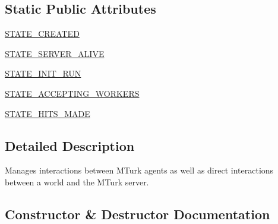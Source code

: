 \subsection*{Static Public Attributes}
\begin{DoxyCompactItemize}
\item 
\hyperlink{classparlai_1_1mturk_1_1core_1_1mturk__manager_1_1MTurkManager_a68e114fed1b4dd106918d9c0de86075b}{S\+T\+A\+T\+E\+\_\+\+C\+R\+E\+A\+T\+ED}
\item 
\hyperlink{classparlai_1_1mturk_1_1core_1_1mturk__manager_1_1MTurkManager_a614fcb4f1df8b5c9c453dcd55e2dd29c}{S\+T\+A\+T\+E\+\_\+\+S\+E\+R\+V\+E\+R\+\_\+\+A\+L\+I\+VE}
\item 
\hyperlink{classparlai_1_1mturk_1_1core_1_1mturk__manager_1_1MTurkManager_a5ea29af39d36c6ab07fb33b3d41885a9}{S\+T\+A\+T\+E\+\_\+\+I\+N\+I\+T\+\_\+\+R\+UN}
\item 
\hyperlink{classparlai_1_1mturk_1_1core_1_1mturk__manager_1_1MTurkManager_a04a9154321ca158c5d5a9e35f17fb4e9}{S\+T\+A\+T\+E\+\_\+\+A\+C\+C\+E\+P\+T\+I\+N\+G\+\_\+\+W\+O\+R\+K\+E\+RS}
\item 
\hyperlink{classparlai_1_1mturk_1_1core_1_1mturk__manager_1_1MTurkManager_a615de083816ca78aac6ca7208b24ed1c}{S\+T\+A\+T\+E\+\_\+\+H\+I\+T\+S\+\_\+\+M\+A\+DE}
\end{DoxyCompactItemize}


\subsection{Detailed Description}
\begin{DoxyVerb}Manages interactions between MTurk agents as well as direct interactions between a
world and the MTurk server.
\end{DoxyVerb}
 

\subsection{Constructor \& Destructor Documentation}
\mbox{\label{classparlai_1_1mturk_1_1core_1_1mturk__manager_1_1MTurkManager_a0ad49b45ee05a62062d4e680c6e6323e}} 
